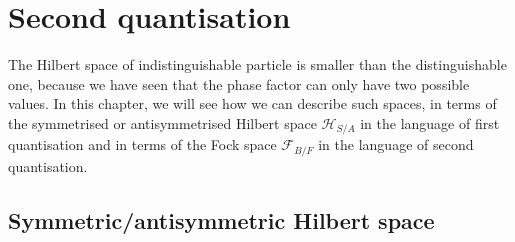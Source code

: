\chapter{Second quantisation}

    The Hilbert space of indistinguishable particle is smaller than the distinguishable one, because we have seen that the phase factor can only have two possible values. In this chapter, we will see how we can describe such spaces, in terms of the symmetrised or antisymmetrised Hilbert space $\mathcal H_{S/A}$ in the language of first quantisation and in terms of the Fock space $\mathcal F_{B/F}$ in the language of second quantisation.

\section{Symmetric/antisymmetric Hilbert space} 

